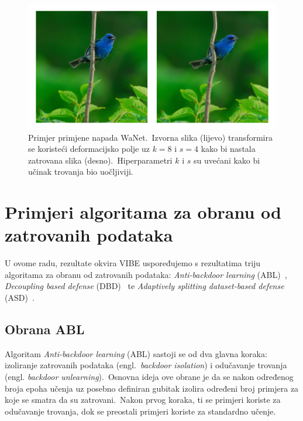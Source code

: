 \documentclass[diplomskirad]{fer}
\begin{document}
\begin{figure}[h]
  \centering
  \includegraphics[scale=0.6]{./Slike/imagenet1k_uzorak_wanet.png}
  \caption{Primjer primjene napada WaNet.\ Izvorna slika (lijevo) transformira se koristeći deformacijsko polje uz $k = 8$ i $s = 4$ kako bi nastala zatrovana slika (desno).\ Hiperparametri $k$ i $s$ su uvećani kako bi učinak trovanja bio uočljiviji.}
  \label{fig:wanet}
\end{figure}

\section{Primjeri algoritama za obranu od zatrovanih podataka}
\label{sek:primjeri_obrana_trovanje}

U ovome radu, rezultate okvira VIBE uspoređujemo s rezultatima triju algoritama za obranu od zatrovanih podataka: \textit{Anti-backdoor learning} (ABL)~\cite{li2021anti}, \textit{Decoupling based defense} (DBD)~\cite{huang2022backdoor} te \textit{Adaptively splitting dataset-based defense} (ASD)~\cite{gao2023backdoor}.\

\subsection{Obrana ABL}
\label{sub:abl}

Algoritam \textit{Anti-backdoor learning} (ABL) sastoji se od dva glavna koraka: izoliranje zatrovanih podataka (engl.\ \textit{backdoor isolation}) i odučavanje trovanja (engl. \textit{backdoor unlearning}).\ 
Osnovna ideja ove obrane je da se nakon određenog broja epoha učenja uz posebno definiran gubitak izolira određeni broj primjera za koje se smatra da su zatrovani.\  
Nakon prvog koraka, ti se primjeri koriste za odučavanje trovanja, dok se preostali primjeri koriste za standardno učenje.\ 
  
\end{document}
